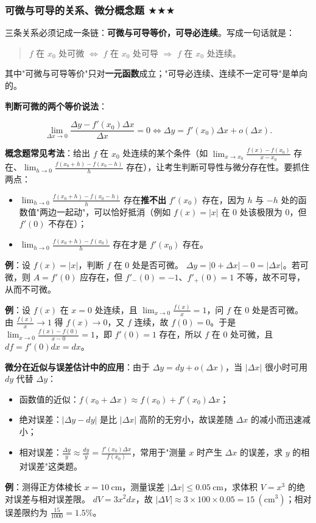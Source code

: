 \documentclass[11pt,openany,UTF8]{ctexbook}
\begin{document}
\subsubsection{可微与可导的关系、微分概念题 $\bigstar$$\bigstar$$\bigstar$}

三条关系必须记成一条链：\textbf{可微与可导等价，可导必连续}。写成一句话就是：

\begin{quote}
$f$ 在 $x_0$ 处可微 $\iff$ $f$ 在 $x_0$ 处可导 $\Longrightarrow$ $f$ 在 $x_0$ 处连续。

\end{quote}
其中"可微与可导等价"只对\textbf{一元函数}成立；"可导必连续、连续不一定可导"是单向的。

\textbf{判断可微的两个等价说法}：

\[\lim_{\Delta x\to 0}\frac{\Delta y-f'(x_0)\Delta x}{\Delta x}=0
\iff \Delta y=f'(x_0)\Delta x+o(\Delta x).\]

\textbf{概念题常见考法}：给出 $f$ 在 $x_0$ 处连续的某个条件（如 $\lim_{x\to x_0}\frac{f(x)-f(x_0)}{x-x_0}$ 存在、$\lim_{h\to 0}\frac{f(x_0+h)-f(x_0-h)}{h}$ 存在），让考生判断可导性与微分存在性。要抓住两点：

\begin{itemize}
\item $\lim_{h\to 0}\frac{f(x_0+h)-f(x_0-h)}{h}$ 存在\textbf{推不出} $f'(x_0)$ 存在，因为 $h$ 与 $-h$ 处的函数值"两边一起动"，可以恰好抵消（例如 $f(x)=|x|$ 在 $0$ 处该极限为 $0$，但 $f'(0)$ 不存在）；
\item $\lim_{h\to 0}\frac{f(x_0+h)-f(x_0)}{h}$ 存在才是 $f'(x_0)$ 存在。
\end{itemize}
\textbf{例}：设 $f(x)=|x|$，判断 $f$ 在 $0$ 处是否可微。 $\Delta y=|0+\Delta x|-0=|\Delta x|$。若可微，则 $A=f'(0)$ 应存在，但 $f'_-(0)=-1$、$f'_+(0)=1$ 不等，故不可导，从而不可微。

\textbf{例}：设 $f(x)$ 在 $x=0$ 处连续，且 $\lim_{x\to 0}\frac{f(x)}{x}=1$，问 $f$ 在 $0$ 处是否可微。 由 $\frac{f(x)}{x}\to 1$ 得 $f(x)\to 0$，又 $f$ 连续，故 $f(0)=0$。于是 $\lim_{x\to 0}\frac{f(x)-f(0)}{x-0}=1$，即 $f'(0)=1$ 存在，所以 $f$ 在 $0$ 处可微，且 $df=f'(0)dx=dx$。

\textbf{微分在近似与误差估计中的应用}：由于 $\Delta y=dy+o(\Delta x)$，当 $|\Delta x|$ 很小时可用 $dy$ 代替 $\Delta y$：

\begin{itemize}
\item 函数值的近似：$f(x_0+\Delta x)\approx f(x_0)+f'(x_0)\Delta x$；
\item 绝对误差：$|\Delta y-dy|$ 是比 $|\Delta x|$ 高阶的无穷小，故误差随 $\Delta x$ 的减小而迅速减小；
\item 相对误差：$\frac{\Delta y}{y}\approx\frac{dy}{y}=\frac{f'(x_0)\Delta x}{f(x_0)}$，常用于"测量 $x$ 时产生 $\Delta x$ 的误差，求 $y$ 的相对误差"这类题。
\end{itemize}
\textbf{例}：测得正方体棱长 $x=10\ \mathrm{cm}$，测量误差 $|\Delta x|\le0.05\ \mathrm{cm}$，求体积 $V=x^3$ 的绝对误差与相对误差限。 $dV=3x^2dx$，故 $|\Delta V|\approx 3\times 100\times 0.05=15\ (\mathrm{cm^3})$；相对误差限约为 $\frac{15}{1000}=1.5\%$。
\end{document}
